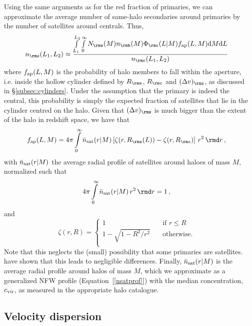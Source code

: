 \documentclass[fleqn,usenatbib,useAMS]{mnras}
\begin{document}
	Using the same arguments as for the red fraction of primaries, we can approximate the average number of same-halo secondaries around primaries by the number of satellites around centrals. Thus,
	\begin{equation}
	n_\rms (L_1, L_2) \approx \frac{\int\limits_{L_1}^{L_2}\int\limits_0^\infty N_\rms (M) n_\rmh (M) \Phi_\rmc (L | M) f_{\rm ap} (L, M) \mathrm{d}M \mathrm{d}L}{n_\rmc (L_1, L_2)}
	\end{equation}
	where $f_{\rm ap} (L, M)$ is the probability of halo members to fall within the aperture, i.e. inside the hollow cylinder defined by $R_\rms$, $R_\rmc$ and $(\Delta v)_\rms$, as discussed in \S\ref{subsec:cylinders}. Under the assumption that the primary is indeed the central, this probability is simply the expected fraction of satellites that lie in the cylinder centred on the halo. Given that $(\Delta v)_\rms$ is much bigger than the extent of the halo in redshift space, we have that
	\begin{equation}
	f_{\rm ap} (L, M) = 4 \pi \int\limits_0^\infty \bar{n}_{\rm sat}(r|M) 
	\left[\zeta(r, R_\rms(L)) - \zeta(r, R_\rmc)\right] \, r^2 \, \rmd r\,,
	\label{eq:f_ap}
	\end{equation}
	with $\bar{n}_{\rm sat}(r|M)$ the average radial profile of satellites around haloes of mass $M$, normalized such that
	\begin{equation}
	4 \pi \int\limits_0^\infty \bar{n}_{\rm sat}(r|M) \, r^2 \, \rmd r = 1\,,
	\end{equation}
	and
	\begin{equation}
	\zeta(r, R) = \begin{cases}
	1 &\quad\text{if } r \leq R \\
	1 - \sqrt{1 - R^2 / r^2} &\quad\text{otherwise.} \\ 
	\end{cases}
	\end{equation}
	Note that this neglects the (small) possibility that some primaries are satellites. \cite{Lange+18a} have shown that this leads to negligible differences. Finally, $\bar{n}_{\rm sat}(r|M)$ is the average radial profile around halos of mass $M$, which we approximate as a generalized NFW profile (Equation~[\ref{nsatprof}]) with the median concentration, $c_{\rm vir}$, as measured in the appropriate halo catalogue.
	
	\subsection{Velocity dispersion}
	
\end{document}

